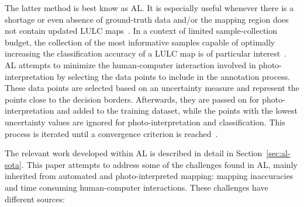 \documentclass[preprint,12pt]{elsarticle}
\begin{document}
The latter method is best know as AL\@. It is especially useful whenever there
is a shortage or even absence of ground-truth data and/or the mapping region
does not contain updated LULC maps~\cite{Su2020}. In a context of limited
sample-collection budget, the collection of the most informative samples
capable of optimally increasing the classification accuracy of a LULC map is
of particular interest~\cite{Su2020}. AL attempts to minimize the
human-computer interaction involved in photo-interpretation by selecting the
data points to include in the annotation process. These data points are
selected based on an uncertainty measure and represent the points close to the
decision borders. Afterwards, they are passed on for photo-interpretation and
added to the training dataset, while the points with the lowest uncertainty
values are ignored for photo-interpretation and classification. This process
is iterated until a convergence criterion is reached~\cite{Pasolli2016}. 

The relevant work developed within AL is described in detail in
Section~\ref{sec:al-sota}. This paper attempts to address some of the
challenges found in AL, mainly inherited from automated and photo-interpreted
mapping: mapping inaccuracies and time consuming human-computer interactions.
These challenges have different sources:
\end{document}
